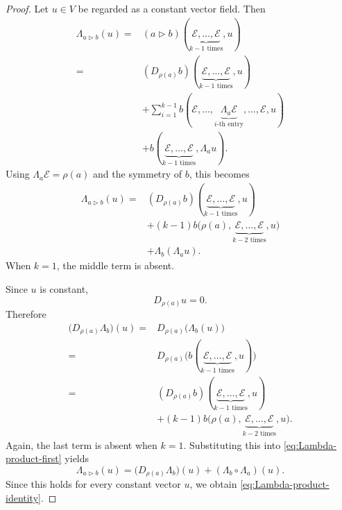 \documentclass[12pt,reqno]{amsart}
\theoremstyle{definition}
\theoremstyle{remark}
\newcommand{\E}{\mathcal{E}}
\begin{document}
\begin{proof}
 Let \(u\in V\)
be regarded as a constant vector field. Then
\[
\begin{aligned}
\Lambda_{a\triangleright b}(u)
={}&
(a\triangleright b)
(\underbrace{\E,\ldots,\E}_{k-1\text{ times}},u)
\\
={}&
(D_{\rho(a)}b)
(\underbrace{\E,\ldots,\E}_{k-1\text{ times}},u)
\\
&+
\sum_{i=1}^{k-1}
b(\E,\ldots,
\underbrace{\Lambda_a\E}_{i\text{-th entry}},
\ldots,\E,u)
\\
&+
b(\underbrace{\E,\ldots,\E}_{k-1\text{ times}},
\Lambda_a u).
\end{aligned}
\]
Using \(\Lambda_a\E=\rho(a)\) and the symmetry of \(b\), this becomes
\begin{equation}
\begin{aligned}
\Lambda_{a\triangleright b}(u)
={}&
(D_{\rho(a)}b)
(\underbrace{\E,\ldots,\E}_{k-1\text{ times}},u)
\\
&+
(k-1)b\bigl(
\rho(a),
\underbrace{\E,\ldots,\E}_{k-2\text{ times}},
u
\bigr)
\\
&+
\Lambda_b(\Lambda_a u).
\end{aligned}
\label{eq:Lambda-product-first}
\end{equation}
When \(k=1\), the middle term is absent.

Since \(u\) is constant,
\[
D_{\rho(a)}u=0.
\]
Therefore
\[
\begin{aligned}
\bigl(D_{\rho(a)}\Lambda_b\bigr)(u)
={}&
D_{\rho(a)}\bigl(\Lambda_b(u)\bigr)
\\
={}&
D_{\rho(a)}
\bigl(
b(\underbrace{\E,\ldots,\E}_{k-1\text{ times}},u)
\bigr)
\\
={}&
(D_{\rho(a)}b)
(\underbrace{\E,\ldots,\E}_{k-1\text{ times}},u)
\\
&+
(k-1)b\bigl(
\rho(a),
\underbrace{\E,\ldots,\E}_{k-2\text{ times}},
u
\bigr).
\end{aligned}
\]
Again, the last term is absent when \(k=1\).
Substituting this into \eqref{eq:Lambda-product-first} yields
\[
\Lambda_{a\triangleright b}(u)
=
\bigl(D_{\rho(a)}\Lambda_b\bigr)(u)
+
(\Lambda_b\circ\Lambda_a)(u).
\]
Since this holds for every constant vector \(u\), we obtain
\eqref{eq:Lambda-product-identity}.
\end{proof}
\end{document}
